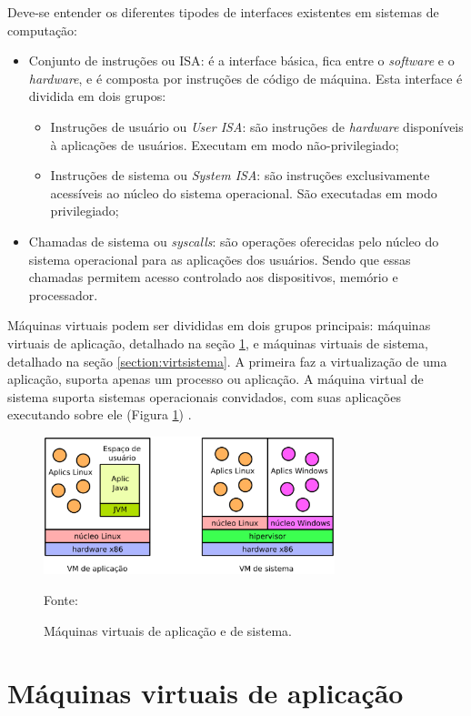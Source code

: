 Deve-se entender os diferentes tipodes de interfaces existentes em sistemas de computação:
\begin{itemize}
 \item Conjunto de instruções ou \ac{ISA}: é a interface básica, fica entre o \textit{software} e o \textit{hardware}, e é composta por 
 instruções de código de máquina. Esta interface é dividida em dois grupos:
 \begin{itemize}
  \item Instruções de usuário ou \textit{User \ac{ISA}}: são instruções de \textit{hardware} disponíveis à aplicações de usuários. Executam
  em modo não-privilegiado;
  \item Instruções de sistema ou \textit{System \ac{ISA}}: são instruções exclusivamente acessíveis ao núcleo do sistema operacional. 
  São executadas em modo privilegiado;
 \end{itemize}
 \item Chamadas de sistema ou \textit{syscalls}: são operações oferecidas pelo núcleo do sistema operacional para as aplicações dos usuários.
 Sendo que essas chamadas permitem acesso controlado aos dispositivos, memório e processador.
\end{itemize}

Máquinas virtuais podem ser divididas em dois grupos principais: máquinas virtuais de aplicação, detalhado na seção 
\ref{section:virtaplicacao}, e máquinas virtuais de sistema, detalhado na seção \ref{section:virtsistema}. A primeira faz a virtualização 
de uma aplicação, suporta apenas um processo ou aplicação. A máquina virtual de sistema suporta sistemas operacionais convidados, com suas 
aplicações executando sobre ele (Figura \ref{fig:vms_tipos}) \cite{laureano2008}.

\begin{figure}[vms_tipos]
 \centering
 \includegraphics[width=320px]{img/vms_tipos.eps}
 \caption{Máquinas virtuais de aplicação e de sistema.}
 \label{fig:vms_tipos}
 Fonte: \citet{laureano2008}
\end{figure}

\section{Máquinas virtuais de aplicação}
\label{section:virtaplicacao}

